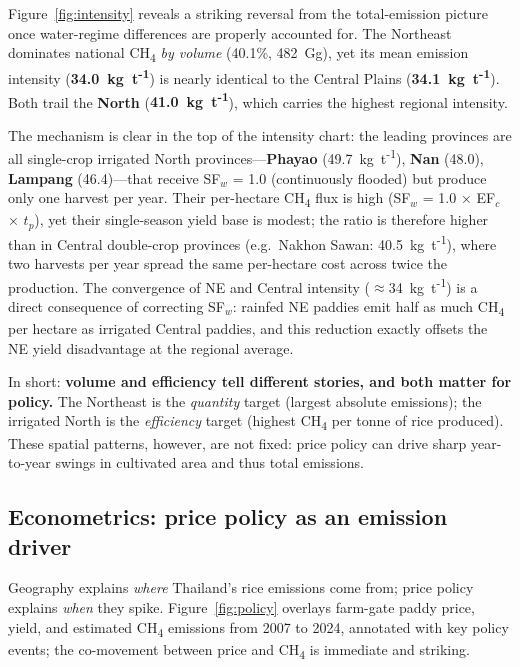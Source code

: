 \documentclass[fleqn,10pt]{olplainarticle}
\begin{document}
Figure~\ref{fig:intensity} reveals a striking reversal from the total-emission
picture once water-regime differences are properly accounted for.
The Northeast dominates national CH\textsubscript{4} \textit{by volume}
(40.1\%, 482~Gg), yet its mean emission intensity
(\textbf{34.0~kg~t\textsuperscript{-1}}) is nearly identical to the Central
Plains (\textbf{34.1~kg~t\textsuperscript{-1}}).
Both trail the \textbf{North} (\textbf{41.0~kg~t\textsuperscript{-1}}), which
carries the highest regional intensity.

The mechanism is clear in the top of the intensity chart: the leading provinces
are all single-crop irrigated North provinces---\textbf{Phayao}
(49.7~kg~t\textsuperscript{-1}), \textbf{Nan} (48.0), \textbf{Lampang}
(46.4)---that receive SF$_w$ = 1.0 (continuously flooded) but produce only one
harvest per year.
Their per-hectare CH\textsubscript{4} flux is high (SF$_w$ = 1.0 × EF$_c$ ×
$t_p$), yet their single-season yield base is modest; the ratio is therefore
higher than in Central double-crop provinces (e.g.\ Nakhon Sawan: 40.5~kg~t\textsuperscript{-1}),
where two harvests per year spread the same per-hectare cost across twice the
production.
The convergence of NE and Central intensity ($\approx$34~kg~t\textsuperscript{-1})
is a direct consequence of correcting SF$_w$: rainfed NE paddies emit half as
much CH\textsubscript{4} per hectare as irrigated Central paddies, and this
reduction exactly offsets the NE yield disadvantage at the regional average.

In short: \textbf{volume and efficiency tell different stories, and both matter
for policy.}
The Northeast is the \textit{quantity} target (largest absolute emissions);
the irrigated North is the \textit{efficiency} target (highest CH\textsubscript{4}
per tonne of rice produced).
These spatial patterns, however, are not fixed: price policy can drive
sharp year-to-year swings in cultivated area and thus total emissions.

\FloatBarrier
\subsection*{Econometrics: price policy as an emission driver}

Geography explains \textit{where} Thailand's rice emissions come from;
price policy explains \textit{when} they spike.
Figure~\ref{fig:policy} overlays farm-gate paddy price, yield, and estimated
CH\textsubscript{4} emissions from 2007 to 2024, annotated with key policy
events; the co-movement between price and CH\textsubscript{4} is immediate and striking.
\end{document}
